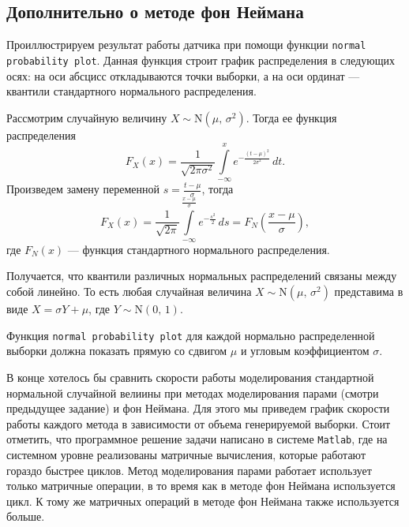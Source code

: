 \subsection{Дополнительно о методе фон Неймана}

Проиллюстрируем результат работы датчика при помощи функции \texttt{normal probability plot}. Данная функция строит график распределения в следующих осях: на оси абсцисс откладываются точки выборки, а на оси ординат --- квантили стандартного нормального распределения.

Рассмотрим случайную величину $X \sim \mbox{N}(\mu,\,\sigma^2)$. Тогда ее функция распределения
$$
        F_X(x) = \frac{1}{\sqrt{2\pi\sigma^2}}\int\limits_{-\infty}^{x} e^{-\frac{(t - \mu)^2}{2\sigma^2}}\,dt.
$$
Произведем замену переменной $s = \frac{t - \mu}{\sigma}$, тогда
$$
        F_X(x) = \frac{1}{\sqrt{2\pi}} \int\limits_{-\infty}^{\frac{x - \mu}{\sigma}} e^{-\frac{s^2}{2}}\,ds
        =
        F_N\left(\frac{x - \mu}{\sigma}\right),
$$
где $F_N(x)$ --- функция стандартного нормального распределения.

Получается, что квантили различных нормальных распределений связаны между собой линейно. То есть любая случайная величина $X \sim \mbox{N}(\mu,\,\sigma^2)$ представима в виде $X = \sigma Y + \mu$, где $Y \sim \mbox{N}(0,\,1)$.

Функция \texttt{normal probability plot} для каждой нормально распределенной выборки должна показать прямую со сдвигом $\mu$ и угловым коэффициентом $\sigma$.

В конце хотелось бы сравнить скорости работы моделирования стандартной нормальной случайной велиины при методах моделирования парами (смотри предыдущее задание) и фон Неймана. Для этого мы приведем график скорости работы каждого метода в зависимости от объема генерируемой выборки. Стоит отметить, что программное решение задачи написано в системе \texttt{Matlab}, где на системном уровне реализованы матричные вычисления, которые работают  гораздо быстрее циклов. Метод моделирования парами работает использует только матричные операции, в то время как в методе фон Неймана используется цикл. К тому же матричных операций в методе фон Неймана также используется больше.

